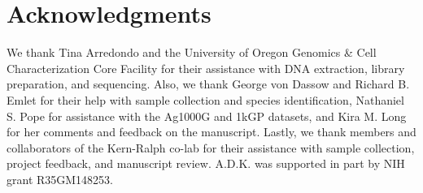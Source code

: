 \section*{Acknowledgments}

We thank Tina Arredondo and the University of Oregon Genomics \& Cell Characterization
Core Facility for their assistance with DNA extraction, library preparation, and
sequencing.
Also, we thank George von Dassow and Richard B. Emlet for their help with sample collection
and species identification, Nathaniel S. Pope for assistance with the Ag1000G and 1kGP
datasets, and Kira M. Long for her comments and feedback on the manuscript.
Lastly, we thank members and collaborators of the Kern-Ralph co-lab for their assistance
with sample collection, project feedback, and manuscript review.
A.D.K. was supported in part by NIH grant R35GM148253.
